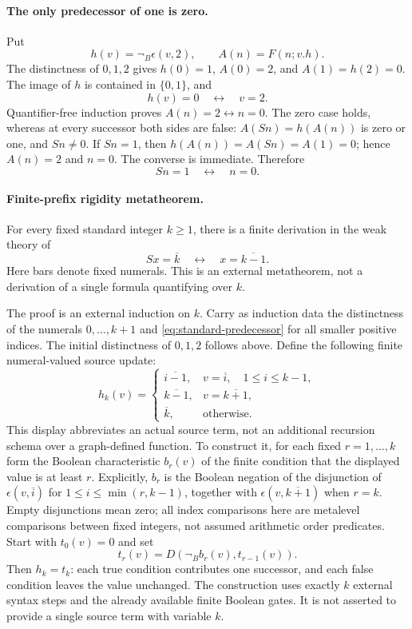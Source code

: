 \paragraph{The only predecessor of one is zero.}
Put
\[
 h(v)=\neg_B\epsilon(v,2),\qquad A(n)=F(n;v.h).
\]
The distinctness of $0,1,2$ gives $h(0)=1$, $A(0)=2$, and
$A(1)=h(2)=0$. The image of $h$ is contained in $\{0,1\}$, and
\[
                         h(v)=0\quad\longleftrightarrow\quad v=2.
\]
Quantifier-free induction proves $A(n)=2\leftrightarrow n=0$.
The zero case holds, whereas at every successor both sides are false:
$A(Sn)=h(A(n))$ is zero or one, and $Sn\ne0$.
If $Sn=1$, then $h(A(n))=A(Sn)=A(1)=0$; hence $A(n)=2$ and $n=0$.
The converse is immediate. Therefore
\[
                              Sn=1\quad\longleftrightarrow\quad n=0.
\]

\paragraph{Finite-prefix rigidity metatheorem.}
For every fixed standard integer $k\ge1$, there is a finite derivation
in the weak theory of
\begin{equation}
 Sx=\overline{k}\quad\longleftrightarrow\quad x=\overline{k-1}.
 \label{eq:standard-predecessor}
\end{equation}
Here bars denote fixed numerals. This is an external metatheorem,
not a derivation of a single formula quantifying over $k$.

The proof is an external induction on $k$. Carry as induction data
the distinctness of the numerals $0,\ldots,k+1$ and
\eqref{eq:standard-predecessor} for all smaller positive indices.
The initial distinctness of $0,1,2$ follows above. Define the following
finite numeral-valued source update:
\[
 h_k(v)=
 \begin{cases}
 \overline{i-1},&v=\overline{i},\quad 1\le i\le k-1,\\
 \overline{k-1},&v=\overline{k+1},\\
 \overline{k},&\text{otherwise}.
 \end{cases}
\]
This display abbreviates an actual source term, not an additional
recursion schema over a graph-defined function. To construct it,
for each fixed $r=1,\ldots,k$ form the Boolean characteristic $b_r(v)$
of the finite condition that the displayed value is at least $r$.
Explicitly, $b_r$ is the Boolean negation of the disjunction of
$\epsilon(v,\overline{i})$ for $1\le i\le\min(r,k-1)$, together
with $\epsilon(v,\overline{k+1})$ when $r=k$. Empty disjunctions
mean zero; all index comparisons here are metalevel comparisons
between fixed integers, not assumed arithmetic order predicates.
Start with $t_0(v)=0$ and set
\[
                  t_r(v)=D(\neg_B b_r(v),t_{r-1}(v)).
\]
Then $h_k=t_k$: each true condition contributes one successor, and
each false condition leaves the value unchanged. The construction
uses exactly $k$ external syntax steps and the already available
finite Boolean gates. It is not asserted to provide a single source
term with variable $k$.

